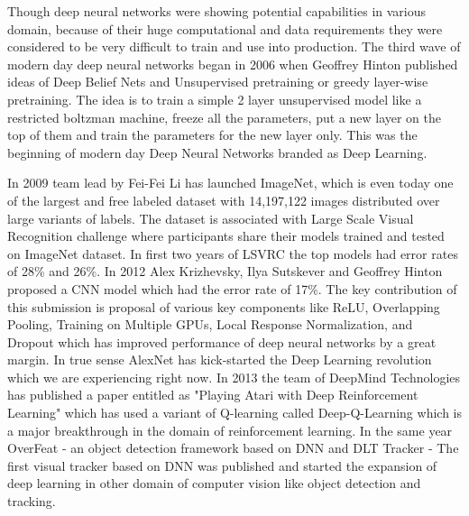 \documentclass[a4paper]{article}
\begin{document}
Though deep  neural networks were showing potential capabilities in various domain, because of their huge computational and data requirements they were considered to be very difficult to train and use into production. The third wave of modern day deep neural networks began in 2006 when Geoffrey Hinton published ideas of Deep Belief Nets and Unsupervised pretraining or greedy layer-wise pretraining. The idea is to train a simple 2 layer unsupervised model like a restricted boltzman machine, freeze all the parameters, put a new layer on the top of them and train the parameters for the new layer only. This was the beginning of modern day Deep Neural Networks branded as Deep Learning. 

In 2009 team lead by Fei-Fei Li has launched ImageNet, which is even today one of the largest and free labeled dataset with 14,197,122 images distributed over large variants of labels. The dataset is associated with Large Scale Visual Recognition challenge where participants share their models trained and tested on ImageNet dataset. In first two years of LSVRC the top models had error rates of 28\% and 26\%. In 2012 Alex Krizhevsky, Ilya Sutskever and Geoffrey Hinton proposed a CNN model which had the error rate of 17\%. The key contribution of this submission is proposal of various key components like ReLU, Overlapping Pooling, Training on Multiple GPUs, Local Response Normalization, and Dropout which has improved performance of deep neural networks by a great margin. In true sense AlexNet has kick-started the Deep Learning revolution which we are experiencing right now. In 2013 the team of DeepMind Technologies has published a paper entitled as "Playing Atari with Deep Reinforcement Learning" which has used a variant of Q-learning called Deep-Q-Learning which is a major breakthrough in the domain of reinforcement learning. In the same year OverFeat - an object detection framework based on DNN and DLT Tracker - The first visual tracker based on DNN was published and started the expansion of deep learning in other domain of computer vision like object detection and tracking. 
\end{document}
